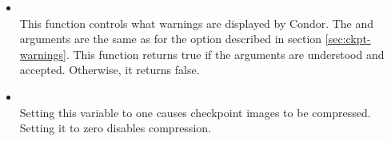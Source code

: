 \begin{itemize}
\item {}\\
This function controls what warnings are displayed by Condor.
The  and  arguments are the same as for the
 option described in section \ref{sec:ckpt-warnings}.  This function returns true
if the arguments are understood and accepted.  Otherwise, it returns false.

\item {}\\
Setting this variable to one causes checkpoint images to be compressed.
Setting it to zero disables compression.

\end{itemize}


